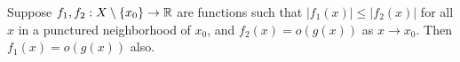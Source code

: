 \begin{exercise} \label{less-than-small-is-small}
	Suppose $f_1, f_2 : X \setminus \{x_0\} \to \mathbb{R}$ are functions such that $|f_1(x)| \leq |f_2(x)|$ for all $x$ in a punctured neighborhood of $x_0$, and $f_2(x) = o(g(x))$ as $x \to x_0$. Then $f_1(x) = o(g(x))$ also. 
\end{exercise}

\begin{comment} 	
\begin{exercise} \label{little-o-multiplicative}
Suppose $f_1, f_2, g_1, g_2 : X \setminus \{x_0\} \to \R$ are functions with $g_1, g_2$ positive such that $f_1(x) = o(g_1(x))$ and $f_2(x) = o(g_2(x))$ as $x \to x_0$. Prove that $(f_1 \cdot f_2)(x) = o((g_1 \cdot g_2)(x))$.
\end{exercise} 

\begin{exercise}
Suppose $f : X \to \R$ is continuous at $x_0$ and $f(x_0) = 0$, and that $f = o(g)$ as $x \to  x_0$ for some function $g : X \setminus\{x_0\} \to \R$. Suppose further that $s : \R \to \R$ is a function such that $s = o(|r|)$ as $r \to 0$. Then $s \circ f = o(g)$ as $x \to x_0$. 
\end{exercise}

\begin{proof}
Suppose $\epsilon > 0$. We want to find an open neighborhood $U$ of $x_0$ such that
\[ |s(f(x))| \leq \epsilon|t(g(x))| \]
for $x \in U$. 

Since $s$ is $o(t)$ as $r \to 0$, we know that for any $\epsilon_1 > 0$ there exists $\delta_1 > 0$ such that $|r| < \delta_1$ implies that
\[ \begin{aligned} |s(r)| \leq \epsilon_1|t(r)|. \end{aligned} \] 
Since $f(x_0) = 0$ and $f$ is continuous at $x_0$, there exists a neighborhood $U_1$ of $x_0$ such that
\[ |f(x)| < \delta_1  \]
for all $x \in U_1$. This means that for $x \in U_1$, we have
\[ |s(f(x))| \leq \epsilon_1|t(f(x))|. \]
Since $f = o(g)$ as $x \to x_0$, for any $\epsilon_2 > 0$ there is another neighborhood $U_2$ of $x_0$ such that $|f(x)| \leq \epsilon_2 |g(x)|$. This means that
\[ |s(f(x))| \leq \epsilon_1 \epsilon_2 |g(x)|. \]

there then exists $\delta_2 > 0$ such that $|h| < \delta$ implies that $|df_a(h) + r(h)| < \delta_1$. Then for $|h| < \delta_2$, we have
\[ |s(df_a(h) + r(h)| \leq \epsilon_1 |df_a(h) + r(h)| 
\leq \epsilon_1|f'(a)||h| + \epsilon_1|r(h)| \]
Since $r$ is $o(|h|)$, for any $\epsilon_2 > 0$ there exists $\delta_3 > 0$ such that $|h| < \delta_3$ implies that $|r(h)| \leq \epsilon_2 |h|$. Let $\delta = \min\{\delta_2, \delta_3\}$. Then for $|h| < \delta$, we can continue the above chain of inequalities to obtain the following.  
\[ |s(df_a(h) + r(h)| \leq \epsilon_1|f'(a)||h| + \epsilon_1 \epsilon_2|h| = \epsilon_1(|f'(a)| + \epsilon_2)|h| \]
So we let $\epsilon_2 = 1$ and then let 
\[ \epsilon_1 = \frac{\epsilon}{|f'(a)| + 1}. \]
The $\delta$ obtained by going through the above process then has the desired property.
\end{proof}
\end{comment}

